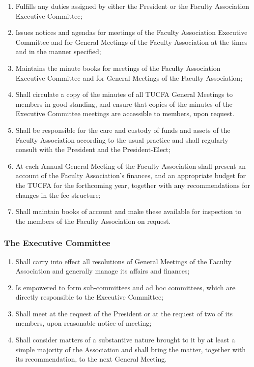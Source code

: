 \documentclass[12pt]{article}
\begin{document}
\begin{enumerate}
\item
Fulfills any duties assigned by either the President or the Faculty Association Executive Committee;
\item
Issues notices and agendas for meetings of the Faculty Association Executive Committee and for General Meetings of the Faculty Association at the times and in the manner specified;
\item
Maintains the minute books for meetings of the Faculty Association Executive Committee and for General Meetings of the Faculty Association;
\item
Shall circulate a copy of the minutes of all TUCFA General Meetings to members in good standing, and ensure that copies of the minutes of the Executive Committee meetings are accessible to members, upon request.
\item
Shall be responsible for the care and custody of funds and assets of the Faculty Association according to the usual practice and shall regularly consult with the President and the President-Elect;
\item
At each Annual General Meeting of the Faculty Association shall present an account of the Faculty Association's finances, and an appropriate budget for the TUCFA for the forthcoming year, together with any recommendations for changes in the fee structure;
\item
Shall maintain books of account and make these available for inspection to the members of the Faculty Association on request.
\end{enumerate}

\subsubsection{The Executive Committee}

\begin{enumerate}
\item
Shall carry into effect all resolutions of General Meetings of the Faculty Association and generally manage its affairs and finances;
\item
Is empowered to form sub-committees and ad hoc committees, which are directly responsible to the Executive Committee;
\item
Shall meet at the request of the President or at the request of two of its members, upon reasonable notice of meeting;
\item
Shall consider matters of a substantive nature brought to it by at least a simple majority of the Association and shall bring the matter, together with its recommendation, to the next General Meeting.
\end{enumerate}
\end{document}
